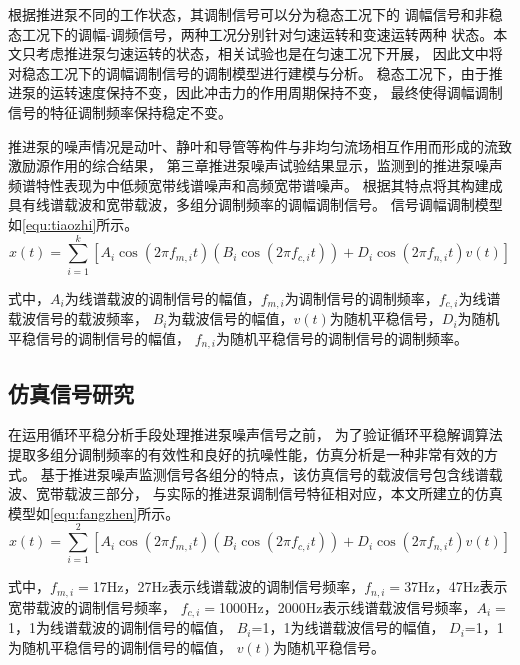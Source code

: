 根据推进泵不同的工作状态，其调制信号可以分为稳态工况下的
调幅信号和非稳态工况下的调幅-调频信号，两种工况分别针对匀速运转和变速运转两种
状态。本文只考虑推进泵匀速运转的状态，相关试验也是在匀速工况下开展，
因此文中将对稳态工况下的调幅调制信号的调制模型进行建模与分析。 
稳态工况下，由于推进泵的运转速度保持不变，因此冲击力的作用周期保持不变，
最终使得调幅调制信号的特征调制频率保持稳定不变。

推进泵的噪声情况是动叶、静叶和导管等构件与非均匀流场相互作用而形成的流致激励源作用的综合结果，
第三章推进泵噪声试验结果显示，监测到的推进泵噪声频谱特性表现为中低频宽带线谱噪声和高频宽带谱噪声。
根据其特点将其构建成具有线谱载波和宽带载波，多组分调制频率的调幅调制信号。
信号调幅调制模型如\autoref{equ:tiaozhi}所示。
\begin{equation}
    \label{equ:tiaozhi}
    x\left ( t \right ) =\sum_{i=1}^{k}\left [ A_{i}\cos \left ( 2\pi f_{m,i}t  \right )\left ( B_{i}\cos\left ( 2\pi f_{c,i}t  \right )   \right )+D_{i}\cos\left ( 2\pi f_{n,i}t  \right )v\left ( t \right )      \right ]  
\end{equation}

式中，$A_i$为线谱载波的调制信号的幅值，$f_{m,i}$为调制信号的调制频率，$f_{c,i}$为线谱载波信号的载波频率，
$B_i$为载波信号的幅值，$v\left ( t \right )$为随机平稳信号，$D_i$为随机平稳信号的调制信号的幅值，
$f_{n,i}$为随机平稳信号的调制信号的调制频率。
\subsection{仿真信号研究}
在运用循环平稳分析手段处理推进泵噪声信号之前，
为了验证循环平稳解调算法提取多组分调制频率的有效性和良好的抗噪性能，仿真分析是一种非常有效的方
式。
基于推进泵噪声监测信号各组分的特点，该仿真信号的载波信号包含线谱载波、宽带载波三部分，
与实际的推进泵调制信号特征相对应，本文所建立的仿真模型如\autoref{equ:fangzhen}所示。 
\begin{equation}
    \label{equ:fangzhen}
    x\left ( t \right ) =\sum_{i=1}^{2}\left [ A_{i}\cos \left ( 2\pi f_{m,i}t  \right )\left ( B_{i}\cos\left ( 2\pi f_{c,i}t  \right )   \right )+D_{i}\cos\left ( 2\pi f_{n,i}t  \right )v\left ( t \right )      \right ]  
\end{equation}

式中，$f_{m,i}=$17Hz，27Hz表示线谱载波的调制信号频率，$f_{n,i}=$37Hz，47Hz表示宽带载波的调制信号频率，
$f_{c,i}=$1000Hz，2000Hz表示线谱载波信号频率，$A_i=$1，1为线谱载波的调制信号的幅值，
$B_i$=1，1为线谱载波信号的幅值，
$D_i$=1，1为随机平稳信号的调制信号的幅值，
$v\left ( t \right )$为随机平稳信号。

